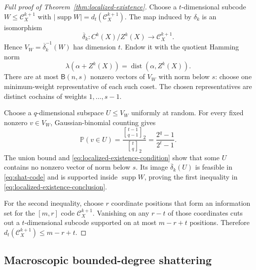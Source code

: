\documentclass[11pt,letterpaper]{article}
\theoremstyle{plain}
\theoremstyle{definition}
\newcommand{\Prob}{\mathbb{P}}
\newcommand{\cC}{\mathcal{C}}
\newcommand{\supp}{\operatorname{supp}}
\newcommand{\dist}{\operatorname{dist}}
\newcommand{\1}{\mathbf{1}}
\newcommand{\abs}[1]{\left|#1\right|}
\newcommand{\qbinom}[2]{\genfrac{[}{]}{0pt}{}{#1}{#2}_{2}}
\begin{document}
\begin{proof}[Full proof of Theorem~\ref{thm:localized-existence}]
Choose a $t$-dimensional subcode $W\le\cC_X^{k+1}$ with
$\abs{\supp W}=d_t(\cC_X^{k+1})$.  The map induced by $\delta_k$ is an isomorphism
\[
 \overline\delta_k:C^k(X)/Z^k(X)\longrightarrow\cC_X^{k+1}.
\]
Hence $V_W=\overline\delta_k^{-1}(W)$ has dimension $t$.  Endow it with the quotient
Hamming norm
\[
 \lambda(\alpha+Z^k(X))=\dist(\alpha,Z^k(X)).
\]
There are at most $\mathsf B(n,s)$ nonzero vectors of $V_W$ with norm below $s$:
choose one minimum-weight representative of each such coset.  The chosen representatives
are distinct cochains of weights $1,\ldots,s-1$.

Choose a $q$-dimensional subspace $U\le V_W$ uniformly at random.  For every fixed
nonzero $v\in V_W$, Gaussian-binomial counting gives
\[
 \Prob(v\in U)=
 \frac{\qbinom{t-1}{q-1}}{\qbinom tq}
 =\frac{2^q-1}{2^t-1}.
\]
The union bound and \eqref{eq:localized-existence-condition} show that some $U$ contains
no nonzero vector of norm below $s$.  Its image $\overline\delta_k(U)$ is feasible in
\eqref{eq:shat-code} and is supported inside $\supp W$, proving the first inequality in
\eqref{eq:localized-existence-conclusion}.

For the second inequality, choose $r$ coordinate positions that form an information set
for the $[m,r]$ code $\cC_X^{k+1}$.  Vanishing on any $r-t$ of those coordinates cuts
out a $t$-dimensional subcode supported on at most $m-r+t$ positions.  Therefore
$d_t(\cC_X^{k+1})\le m-r+t$.
\end{proof}

\subsection{Macroscopic bounded-degree shattering}
\label{app:macroscopic-shattering}
\end{document}
